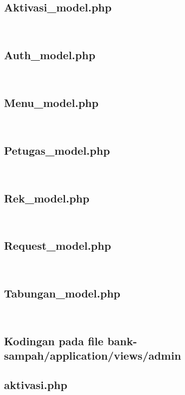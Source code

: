 \subsection{Aktivasi\_model.php}
\hfill\\

\subsection{Auth\_model.php}
\hfill\\

\subsection{Menu\_model.php}
\hfill\\

\subsection{Petugas\_model.php}
\hfill\\

\subsection{Rek\_model.php}
\hfill\\

\subsection{Request\_model.php}
\hfill\\

\subsection{Tabungan\_model.php}
\hfill\\


\subsection{Kodingan pada file bank-sampah/application/views/admin}
\subsection{aktivasi.php}
\hfill\\

